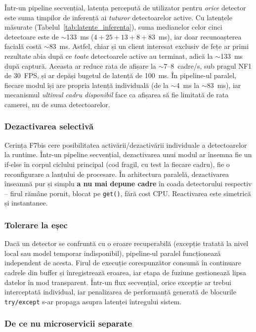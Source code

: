 \documentclass[../../main.tex]{subfiles}
\begin{document}
Într-un pipeline secvențial, latența percepută de utilizator pentru \emph{orice} detector este suma timpilor de inferență ai \emph{tuturor} detectoarelor active. Cu latențele măsurate (Tabelul~\ref{tab:latente_inferenta}), suma medianelor celor cinci detectoare este de $\sim$133~ms ($4 + 25 + 13 + 8 + 83$~ms), iar doar recunoașterea facială costă $\sim$83~ms. Astfel, chiar și un client interesat exclusiv de fețe ar primi rezultate abia după ce \emph{toate} detectoarele active au terminat, adică la $\sim$133~ms după captură. Aceasta ar reduce rata de afișare la $\sim$7--8~cadre/s, sub pragul NF1 de 30~FPS, și ar depăși bugetul de latență de 100~ms. În pipeline-ul paralel, fiecare modul își are propria latență individuală (de la $\sim$4~ms la $\sim$83~ms), iar mecanismul \emph{ultimul cadru disponibil} face ca afișarea să fie limitată de rata camerei, nu de suma detectoarelor.

\subsubsection{Dezactivarea selectivă}

Cerința F7bis cere posibilitatea activării/dezactivării individuale a detectoarelor la runtime. Într-un pipeline secvențial, dezactivarea unui modul ar însemna fie un if-else în corpul ciclului principal (cod fragil, cu test la fiecare cadru), fie o reconfigurare a lanțului de procesare. În arhitectura paralelă, dezactivarea înseamnă pur și simplu \textbf{a nu mai depune cadre} în coada detectorului respectiv -- firul rămâne pornit, blocat pe \texttt{get()}, fără cost CPU. Reactivarea este simetrică și instantanee.

\subsubsection{Tolerare la eșec}

Dacă un detector se confruntă cu o eroare recuperabilă (excepție tratată la nivel local sau model temporar indisponibil), pipeline-ul paralel funcționează independent de acesta. Firul de execuție corespunzător consumă în continuare cadrele din buffer și înregistrează eroarea, iar etapa de fuziune gestionează lipsa datelor în mod transparent. Într-un flux secvențial, orice excepție ar trebui interceptată individual, iar penalizarea de performanță generată de blocurile \texttt{try/except} s-ar propaga asupra latenței întregului sistem.

\subsubsection{De ce nu microservicii separate}
\end{document}

